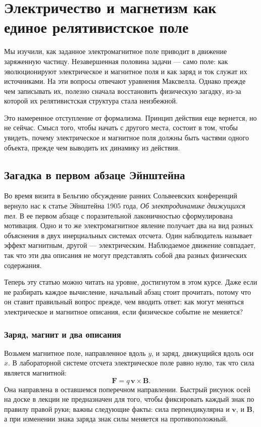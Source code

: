 \chapter{Электричество и магнетизм как единое релятивистское поле}

Мы изучили, как заданное электромагнитное поле приводит в движение заряженную частицу. Незавершенная половина задачи — само поле: как эволюционируют электрическое и магнитное поля и как заряд и ток служат их источниками. На эти вопросы отвечают уравнения Максвелла. Однако прежде чем записывать их, полезно сначала восстановить физическую загадку, из-за которой их релятивистская структура стала неизбежной.

Это намеренное отступление от формализма. Принцип действия еще вернется, но не сейчас. Смысл того, чтобы начать с другого места, состоит в том, чтобы увидеть, почему электрическое и магнитное поля должны быть частями одного объекта, прежде чем выводить их динамику из действия.

\section{Загадка в первом абзаце Эйнштейна}

Во время визита в Бельгию обсуждение ранних Сольвеевских конференций вернуло нас к статье Эйнштейна 1905 года, \emph{Об электродинамике движущихся тел}. В ее первом абзаце с поразительной лаконичностью сформулирована мотивация. Одно и то же электромагнитное явление получает два на вид разных объяснения в двух инерциальных системах отсчета. Один наблюдатель называет эффект магнитным, другой — электрическим. Наблюдаемое движение совпадает, так что эти два описания не могут представлять собой два разных физических содержания.

Теперь эту статью можно читать на уровне, достигнутом в этом курсе. Даже если не разбирать каждое вычисление, начальный абзац стоит прочитать, потому что он ставит правильный вопрос прежде, чем вводить ответ: как могут меняться электрическое и магнитное описания, если физическое событие не меняется?

\subsection{Заряд, магнит и два описания}

Возьмем магнитное поле, направленное вдоль \(y\), и заряд, движущийся вдоль оси \(x\). В лабораторной системе отсчета электрическое поле равно нулю, так что сила является магнитной:
\begin{equation}
\mathbf F=q\,\mathbf v\times\mathbf B.
\end{equation}
Она направлена в оставшемся поперечном направлении. Быстрый рисунок осей на доске в лекции не предназначен для того, чтобы фиксировать каждый знак по правилу правой руки; важны следующие факты: сила перпендикулярна и \(\mathbf v\), и \(\mathbf B\), а при изменении знака заряда знак силы меняется на противоположный.


